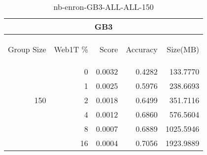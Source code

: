 \begin{center}
\begin{table}[htbp] 
 \begin{center}
\begin{tabular}{ | r | r | r | r | r |}
\hline
\multicolumn{5}{|c|}{GB3}\\
\hline
\begin{sideways}Group Size\end{sideways} & \begin{sideways}Web1T \%\end{sideways} & \begin{sideways}Score\end{sideways} & \begin{sideways}Accuracy\end{sideways} & \begin{sideways}Size(MB)\end{sideways}\\
\hline
\multirow{5}{*}{150}
 & 0 & 0.0032 & 0.4282 & 133.7770\\ \cline{2-5}
 & 1 & 0.0025 & 0.5976 & 238.6693\\ \cline{2-5}
 & 2 & 0.0018 & 0.6499 & 351.7116\\ \cline{2-5}
 & 4 & 0.0012 & 0.6860 & 576.5604\\ \cline{2-5}
 & 8 & 0.0007 & 0.6889 & 1025.5946\\ \cline{2-5}
 & 16 & 0.0004 & 0.7056 & 1923.9889\\ \cline{2-5}
\hline
\end{tabular}
\caption{nb-enron-GB3-ALL-ALL-150}
\label{table:nb-enron-GB3-ALL-ALL-150}
\end{center}
 \end{table}
\end{center}

